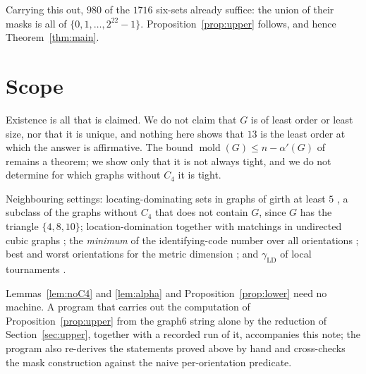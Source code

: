 \documentclass[11pt]{amsart}
\theoremstyle{definition}
\theoremstyle{remark}
\DeclareMathOperator{\mold}{mold}
\newcommand{\gammaLD}{\gamma_{\mathrm{LD}}}
\begin{document}
Carrying this out, $980$ of the $1716$ six-sets already suffice: the union of
their masks is all of $\{0,1,\dots,2^{22}-1\}$. Proposition~\ref{prop:upper}
follows, and hence Theorem~\ref{thm:main}.

\section{Scope}\label{sec:status}

Existence is all that is claimed. We do not claim that $G$ is of least order or
least size, nor that it is unique, and nothing here shows that $13$ is the
least order at which the answer is affirmative. The bound
$\mold(G)\le n-\alpha'(G)$ of \cite[Lemma~34]{BDLP} remains a theorem; we show
only that it is not always tight, and we do not determine for which graphs
without $C_4$ it is tight.

Neighbouring settings: locating-dominating sets in graphs of
girth at least $5$ \cite{BFH}, a subclass of the graphs without $C_4$ that does
not contain $G$, since $G$ has the triangle $\{4,8,10\}$; location-domination
together with matchings in undirected cubic graphs \cite{FH}; the
\emph{minimum} of the identifying-code number over all orientations \cite{CH};
best and worst orientations for the metric dimension \cite{ABC}; and $\gammaLD$
of local tournaments \cite{BBLP}.

Lemmas~\ref{lem:noC4} and \ref{lem:alpha} and Proposition~\ref{prop:lower} need
no machine. A program that carries out the computation of
Proposition~\ref{prop:upper} from the graph6 string alone by the reduction of
Section~\ref{sec:upper}, together with a recorded run of it, accompanies this
note; the program also re-derives the statements proved above by hand and
cross-checks the mask construction against the naive per-orientation predicate.
\end{document}
